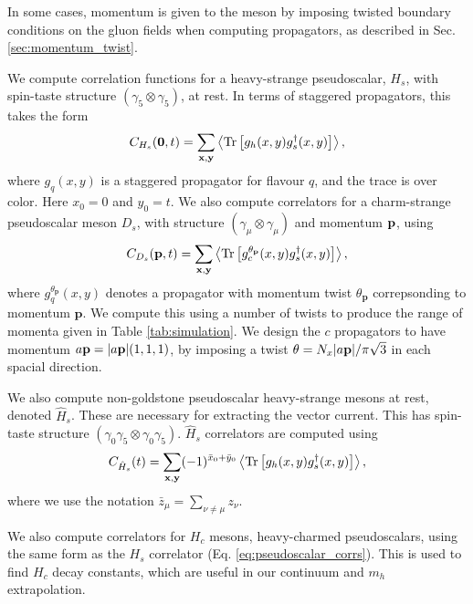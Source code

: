 In some cases, momentum is given to the meson by imposing twisted boundary conditions on the gluon fields when computing propagators, as described in Sec. \ref{sec:momentum_twist}.


We compute correlation functions for a heavy-strange pseudoscalar, $H_s$, with spin-taste structure $(\gamma_5\otimes \gamma_5)$, at rest. In terms of staggered propagators, this takes the form
\begin{align}
  C_{H_s}({\textbf{0}},t) = \sum_{\bf{x},\bf{y}} \left\langle \text{Tr}\left[ g_h(x,y) g_s^{\dagger}(x,y) \right] \right\rangle,
  \label{eq:pseudoscalar_corrs}
\end{align}
where $g_q(x,y)$ is a staggered propagator for flavour $q$, and the trace is over color. Here $x_0=0$ and $y_0=t$. We also compute correlators for a charm-strange pseudoscalar meson $D_s$, with structure $(\gamma_{\mu}\otimes \gamma_{\mu})$ and momentum ${\bf{p}}$, using
\begin{align}
  C_{D_s}({\textbf{p}},t) = \sum_{\bf{x},\bf{y}} \left\langle \text{Tr}\left[ g^{\theta_{\textbf{p}}}_c(x,y) g_s^{\dagger}(x,y) \right] \right\rangle,
\end{align}
where $g_q^{\theta_{\textbf{p}}}(x,y)$ denotes a propagator with momentum twist $\theta_{\textbf{p}}$ correpsonding to momentum ${\textbf{p}}$. We compute this using a number of twists to produce the range of momenta given in Table \ref{tab:simulation}. We design the $c$ propagators to have momentum $a{\bf{p}} = |a{\bf{p}}|(1,1,1)$, by imposing a twist $\theta = N_x |a{\bf{p}}| / \pi \sqrt{3}$ in each spacial direction.

We also compute non-goldstone pseudoscalar heavy-strange mesons at rest, denoted $\hat{H}_s$. These are necessary for extracting the vector current. This has spin-taste structure $(\gamma_0\gamma_5\otimes \gamma_0\gamma_5)$. $\hat{H}_s$ correlators are computed using
\begin{align}
  C_{\hat{H}_s}(t) = \sum_{\bf{x},\bf{y}}(-1)^{\bar{x}_0+\bar{y}_0} \left\langle \text{Tr}\left[ g_h(x,y) g^{\dagger}_s(x,y) \right] \right\rangle,
\end{align}
where we use the notation $\bar{z}_{\mu} = \sum_{\nu\neq\mu} z_{\nu}$.

We also compute correlators for $H_c$ mesons, heavy-charmed pseudoscalars, using the same form as the $H_s$ correlator (Eq. \eqref{eq:pseudoscalar_corrs}). This is used to find $H_c$ decay constants, which are useful in our continuum and $m_h$ extrapolation.

